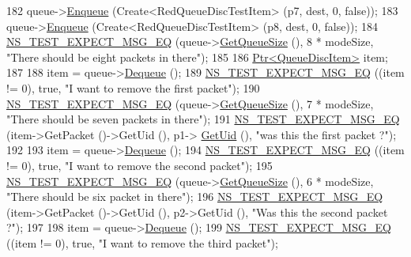 \begin{DoxyCode}
182   queue->\hyperlink{classns3_1_1QueueDisc_af452fb01b98fed312125163f1fe85431}{Enqueue} (Create<RedQueueDiscTestItem> (p7, dest, 0, \textcolor{keyword}{false}));
183   queue->\hyperlink{classns3_1_1QueueDisc_af452fb01b98fed312125163f1fe85431}{Enqueue} (Create<RedQueueDiscTestItem> (p8, dest, 0, \textcolor{keyword}{false}));
184   \hyperlink{group__testing_ga7304ba46a28d8cf08dfdfd6499cf7068}{NS\_TEST\_EXPECT\_MSG\_EQ} (queue->\hyperlink{classns3_1_1RedQueueDisc_aa201a831b85c287a99d7a5e04455b463}{GetQueueSize} (), 8 * modeSize, \textcolor{stringliteral}{"There
       should be eight packets in there"});
185 
186   \hyperlink{classns3_1_1Ptr}{Ptr<QueueDiscItem>} item;
187 
188   item = queue->\hyperlink{classns3_1_1QueueDisc_a6c13fc489822c1487f61c2289f2e3629}{Dequeue} ();
189   \hyperlink{group__testing_ga7304ba46a28d8cf08dfdfd6499cf7068}{NS\_TEST\_EXPECT\_MSG\_EQ} ((item != 0), \textcolor{keyword}{true}, \textcolor{stringliteral}{"I want to remove the first packet"});
190   \hyperlink{group__testing_ga7304ba46a28d8cf08dfdfd6499cf7068}{NS\_TEST\_EXPECT\_MSG\_EQ} (queue->\hyperlink{classns3_1_1RedQueueDisc_aa201a831b85c287a99d7a5e04455b463}{GetQueueSize} (), 7 * modeSize, \textcolor{stringliteral}{"There
       should be seven packets in there"});
191   \hyperlink{group__testing_ga7304ba46a28d8cf08dfdfd6499cf7068}{NS\_TEST\_EXPECT\_MSG\_EQ} (item->GetPacket ()->GetUid (), p1->
      \hyperlink{classns3_1_1Packet_a1f212c825b50e54d94f5b9ae99592e6a}{GetUid} (), \textcolor{stringliteral}{"was this the first packet ?"});
192 
193   item = queue->\hyperlink{classns3_1_1QueueDisc_a6c13fc489822c1487f61c2289f2e3629}{Dequeue} ();
194   \hyperlink{group__testing_ga7304ba46a28d8cf08dfdfd6499cf7068}{NS\_TEST\_EXPECT\_MSG\_EQ} ((item != 0), \textcolor{keyword}{true}, \textcolor{stringliteral}{"I want to remove the second packet"});
195   \hyperlink{group__testing_ga7304ba46a28d8cf08dfdfd6499cf7068}{NS\_TEST\_EXPECT\_MSG\_EQ} (queue->\hyperlink{classns3_1_1RedQueueDisc_aa201a831b85c287a99d7a5e04455b463}{GetQueueSize} (), 6 * modeSize, \textcolor{stringliteral}{"There
       should be six packet in there"});
196   \hyperlink{group__testing_ga7304ba46a28d8cf08dfdfd6499cf7068}{NS\_TEST\_EXPECT\_MSG\_EQ} (item->GetPacket ()->GetUid (), p2->GetUid (), \textcolor{stringliteral}{"Was this the
       second packet ?"});
197 
198   item = queue->\hyperlink{classns3_1_1QueueDisc_a6c13fc489822c1487f61c2289f2e3629}{Dequeue} ();
199   \hyperlink{group__testing_ga7304ba46a28d8cf08dfdfd6499cf7068}{NS\_TEST\_EXPECT\_MSG\_EQ} ((item != 0), \textcolor{keyword}{true}, \textcolor{stringliteral}{"I want to remove the third packet"});

\end{DoxyCode}
